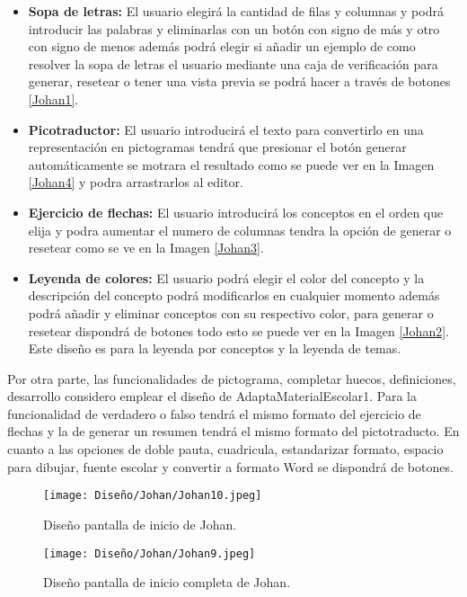 \begin{itemize}
    \item \textbf{Sopa de letras:} El usuario elegirá la cantidad de filas y columnas y podrá introducir las palabras y eliminarlas con un botón con signo de más y otro con signo de menos además podrá elegir si añadir un ejemplo de como resolver la sopa de letras el usuario mediante una caja de verificación para generar, resetear o tener una vista previa se podrá hacer a través de botones \ref{Johan1}. 
    \item \textbf{Picotraductor:} El usuario introducirá el texto para convertirlo en una representación en pictogramas tendrá que presionar el botón generar automáticamente se motrara el resultado como se puede ver en la Imagen \ref{Johan4} y podra arrastrarlos al editor.
    \item \textbf{Ejercicio de flechas:} El usuario introducirá los conceptos en el orden que elija y podra aumentar el numero de columnas tendra la opción de generar o resetear como se ve en la Imagen \ref{Johan3}.
    \item  \textbf{Leyenda de colores:} El usuario podrá elegir el color del concepto y la descripción del concepto podrá modificarlos en cualquier momento además podrá añadir y eliminar conceptos con su respectivo color, para generar o resetear dispondrá de botones todo esto se puede ver en la Imagen \ref{Johan2}. Este diseño es para la leyenda por conceptos y la leyenda de temas.
\end{itemize}
Por otra parte, las funcionalidades de pictograma, completar huecos, definiciones, desarrollo considero emplear el diseño de AdaptaMaterialEscolar1. Para la funcionalidad de verdadero o falso tendrá el mismo formato del ejercicio de flechas y la de generar un resumen tendrá el mismo formato del pictotraducto. En cuanto a las opciones de doble pauta, cuadricula, estandarizar formato, espacio para dibujar, fuente escolar y convertir a formato Word se dispondrá de botones.

\begin{figure}[ht!]
  \centering
  \texttt{[image: Diseño/Johan/Johan10.jpeg]}
  \caption{Diseño pantalla de inicio de Johan.}
  \label{Johan10}
\end{figure}

\begin{figure}[ht!]
  \centering
  \texttt{[image: Diseño/Johan/Johan9.jpeg]}
  \caption{Diseño pantalla de inicio completa de Johan.}
  \label{Johan9}
\end{figure}

